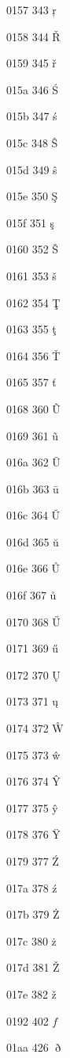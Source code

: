 \documentclass[11pt]{article}
\begin{document}
0157 343 \c{r}

0158 344 \v{R}

0159 345 \v{r}

015a 346 \'S

015b 347 \'s

015c 348 \^S

015d 349 \^s

015e 350 \c{S}

015f 351 \c{s}

0160 352 \v{S}

0161 353 \v{s}

0162 354 \c{T}

0163 355 \c{t}

0164 356 \v{T}

0165 357 \v{t}



0168 360 \~U

0169 361 \~u

016a 362 \=U

016b 363 \=u

016c 364 \u{U}

016d 365 \u{u}

016e 366 \r{U}

016f 367 \r{u}

0170 368 \H{U}

0171 369 \H{u}

0172 370 \k{U}

0173 371 \k{u}

0174 372 \^W

0175 373 \^w

0176 374 \^Y

0177 375 \^y

0178 376 \"Y

0179 377 \'Z

017a 378 \'z

017b 379 \.Z

017c 380 \.z

017d 381 \v{Z}

017e 382 \v{z}

0192 402 \ensuremath{f}



01aa 426 \ensuremath{\eth}

\end{document}
